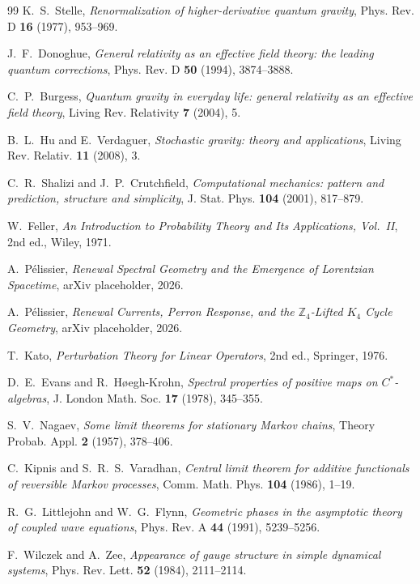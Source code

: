 \documentclass[11pt]{article}
\theoremstyle{definition}
\theoremstyle{remark}
\begin{document}
\begin{thebibliography}{99}
K.~S.~Stelle, \emph{Renormalization of higher-derivative quantum gravity},
Phys. Rev. D \textbf{16} (1977), 953--969.

J.~F.~Donoghue,
\emph{General relativity as an effective field theory: the leading quantum
corrections}, Phys. Rev. D \textbf{50} (1994), 3874--3888.

C.~P.~Burgess,
\emph{Quantum gravity in everyday life: general relativity as an effective field
theory}, Living Rev. Relativity \textbf{7} (2004), 5.

B.~L.~Hu and E.~Verdaguer,
\emph{Stochastic gravity: theory and applications},
Living Rev. Relativ. \textbf{11} (2008), 3.

C.~R.~Shalizi and J.~P.~Crutchfield,
\emph{Computational mechanics: pattern and prediction, structure and simplicity},
J. Stat. Phys. \textbf{104} (2001), 817--879.

W.~Feller, \emph{An Introduction to Probability Theory and Its Applications,
Vol.~II}, 2nd ed., Wiley, 1971.

A.~P\'elissier,
\emph{Renewal Spectral Geometry and the Emergence of Lorentzian Spacetime},
arXiv placeholder, 2026.

A.~P\'elissier,
\emph{Renewal Currents, Perron Response, and the
\(\mathbb Z_4\)-Lifted \(K_4\) Cycle Geometry},
arXiv placeholder, 2026.

T.~Kato, \emph{Perturbation Theory for Linear Operators}, 2nd ed., Springer, 1976.

D.~E.~Evans and R.~H\o egh-Krohn,
\emph{Spectral properties of positive maps on $C^*$-algebras},
J. London Math. Soc. \textbf{17} (1978), 345--355.

S.~V.~Nagaev, \emph{Some limit theorems for stationary Markov chains}, Theory
Probab. Appl. \textbf{2} (1957), 378--406.

C.~Kipnis and S.~R.~S.~Varadhan, \emph{Central limit theorem for additive
functionals of reversible Markov processes}, Comm. Math. Phys. \textbf{104}
(1986), 1--19.

R.~G.~Littlejohn and W.~G.~Flynn,
\emph{Geometric phases in the asymptotic theory of coupled wave equations},
Phys. Rev. A \textbf{44} (1991), 5239--5256.

F.~Wilczek and A.~Zee,
\emph{Appearance of gauge structure in simple dynamical systems},
Phys. Rev. Lett. \textbf{52} (1984), 2111--2114.


\end{thebibliography}
\end{document}
